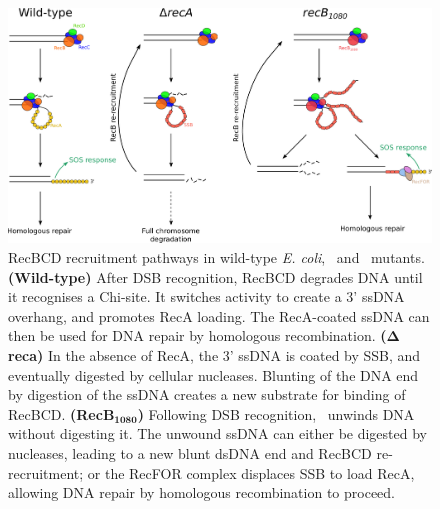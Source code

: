 \begin{figure}[htbp]
    \centering
    \includegraphics[width=\textwidth]{Figures/Fig_mutants_pathways.pdf}
    \caption{RecBCD recruitment pathways in wild-type \emph{E. coli}, \dreca\ and \geneteneighty\ mutants. \textbf{(Wild-type)} After DSB recognition, RecBCD degrades DNA until it recognises a Chi-site. It switches activity to create a 3' ssDNA overhang, and promotes RecA loading. The RecA-coated ssDNA can then be used for DNA repair by homologous recombination. \textbf{($\mathbf{\Delta}$reca)} In the absence of RecA, the 3' ssDNA is coated by SSB, and eventually digested by cellular nucleases. Blunting of the DNA end by digestion of the ssDNA creates a new substrate for binding of RecBCD. \textbf{(RecB$\mathbf{_{1080}}$)} Following DSB recognition, \teneighty\ unwinds DNA without digesting it. The unwound ssDNA can either be digested by nucleases, leading to a new blunt dsDNA end and RecBCD re-recruitment; or the RecFOR complex displaces SSB to load RecA, allowing DNA repair by homologous recombination to proceed.}
    \label{Fig:pathways}
\end{figure}

